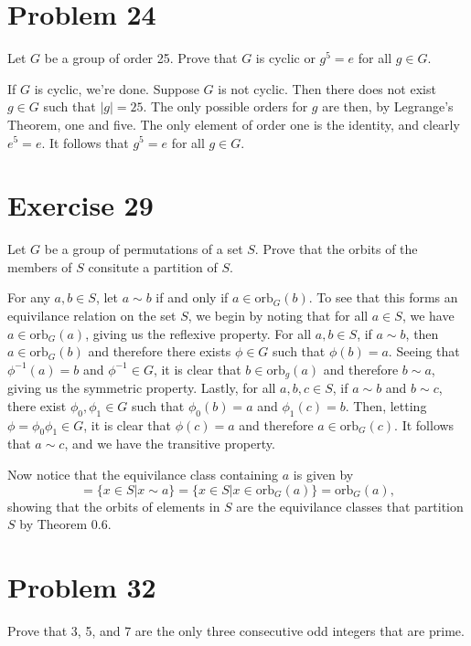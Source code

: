 \documentclass[12pt]{article}
\newcommand{\orb}{\mbox{orb}}
\begin{document}
\section*{Problem 24}

Let $G$ be a group of order 25.  Prove that $G$ is cyclic or $g^5=e$ for all $g\in G$.

If $G$ is cyclic, we're done.  Suppose $G$ is not cyclic.  Then there does not
exist $g\in G$ such that $|g|=25$.  The only possible orders for $g$ are
then, by Legrange's Theorem, one and five.  The only element of order one
is the identity, and clearly $e^5=e$.  It follows that $g^5=e$ for all $g\in G$.

\section*{Exercise 29}

Let $G$ be a group of permutations of a set $S$.  Prove that the orbits of the
members of $S$ consitute a partition of $S$.

For any $a,b\in S$, let $a\sim b$ if and only if $a\in\orb_G(b)$.
To see that this forms an equivilance relation on the set $S$,
we begin by noting that for all $a\in S$, we have $a\in\orb_G(a)$,
giving us the reflexive property.  For all $a,b\in S$, if $a\sim b$,
then $a\in\orb_G(b)$ and therefore there exists $\phi\in G$ such
that $\phi(b)=a$.  Seeing that $\phi^{-1}(a)=b$ and $\phi^{-1}\in G$, it is clear
that $b\in\orb_g(a)$ and therefore $b\sim a$, giving us the symmetric property.
Lastly, for all $a,b,c\in S$, if $a\sim b$ and $b\sim c$, there exist $\phi_0,\phi_1\in G$
such that $\phi_0(b)=a$ and $\phi_1(c)=b$.  Then, letting $\phi=\phi_0\phi_1\in G$,
it is clear that $\phi(c)=a$ and therefore $a\in\orb_G(c)$.  It follows that $a\sim c$,
and we have the transitive property.

Now notice that the equivilance class containing $a$ is given by
\begin{equation*}
[a]=\{x\in S|x\sim a\}=\{x\in S|x\in\orb_G(a)\}=\orb_G(a),
\end{equation*}
showing that the orbits of elements in $S$ are the equivilance classes
that partition $S$ by Theorem 0.6.

\section*{Problem 32}

Prove that 3, 5, and 7 are the only three consecutive odd integers that are prime.
\end{document}
